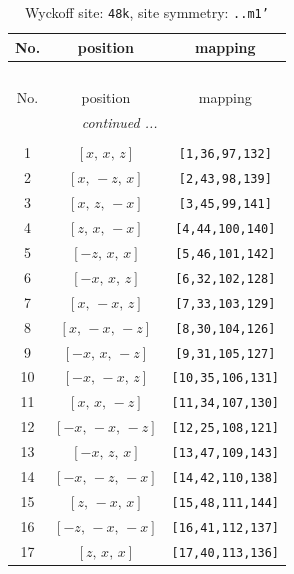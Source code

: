 \documentclass[fleqn,8pt]{jsarticle}
\begin{document}
\begin{longtable}{ccc}
\caption{Wyckoff site: {\tt 48k}, site symmetry: {\tt ..m1'}}
 \\
 \hline \hline
No. & position & mapping \\ \hline \endfirsthead

\multicolumn{2}{l}{\tablename\ \thetable{}} \\
 \hline \hline
No. & position & mapping \\ \hline \endhead

 \hline \hline
\multicolumn{2}{r}{\footnotesize\it continued ...} \\ \endfoot

 \hline \hline
\multicolumn{2}{r}{} \\ \endlastfoot

1 & $\left[ x,\, x,\, z \right]$ & {\tt [1,36,97,132]} \\ \hline
2 & $\left[ x,\, - z,\, x \right]$ & {\tt [2,43,98,139]} \\ \hline
3 & $\left[ x,\, z,\, - x \right]$ & {\tt [3,45,99,141]} \\ \hline
4 & $\left[ z,\, x,\, - x \right]$ & {\tt [4,44,100,140]} \\ \hline
5 & $\left[ - z,\, x,\, x \right]$ & {\tt [5,46,101,142]} \\ \hline
6 & $\left[ - x,\, x,\, z \right]$ & {\tt [6,32,102,128]} \\ \hline
7 & $\left[ x,\, - x,\, z \right]$ & {\tt [7,33,103,129]} \\ \hline
8 & $\left[ x,\, - x,\, - z \right]$ & {\tt [8,30,104,126]} \\ \hline
9 & $\left[ - x,\, x,\, - z \right]$ & {\tt [9,31,105,127]} \\ \hline
10 & $\left[ - x,\, - x,\, z \right]$ & {\tt [10,35,106,131]} \\ \hline
11 & $\left[ x,\, x,\, - z \right]$ & {\tt [11,34,107,130]} \\ \hline
12 & $\left[ - x,\, - x,\, - z \right]$ & {\tt [12,25,108,121]} \\ \hline
13 & $\left[ - x,\, z,\, x \right]$ & {\tt [13,47,109,143]} \\ \hline
14 & $\left[ - x,\, - z,\, - x \right]$ & {\tt [14,42,110,138]} \\ \hline
15 & $\left[ z,\, - x,\, x \right]$ & {\tt [15,48,111,144]} \\ \hline
16 & $\left[ - z,\, - x,\, - x \right]$ & {\tt [16,41,112,137]} \\ \hline
17 & $\left[ z,\, x,\, x \right]$ & {\tt [17,40,113,136]} \\ \hline

\end{longtable}
\end{document}
